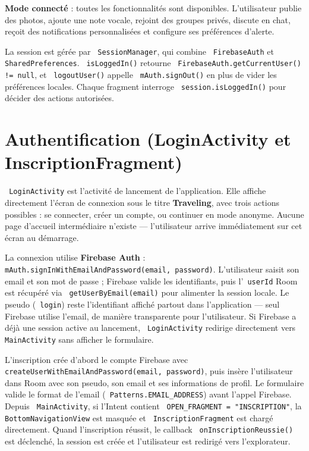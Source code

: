 \documentclass[a4paper,12pt,openany]{report}
\newcommand{\ic}[1]{\texttt{\small\colorbox{lightbg}{\color{navy!90} #1}}}
\begin{document}
\textbf{Mode connecté} : toutes les fonctionnalités sont disponibles.
L'utilisateur publie des photos, ajoute une note vocale, rejoint des groupes
privés, discute en chat, reçoit des notifications personnalisées et configure
ses préférences d'alerte.

La session est gérée par \ic{SessionManager}, qui combine \ic{FirebaseAuth} et
\ic{SharedPreferences}. \ic{isLoggedIn()} retourne \ic{FirebaseAuth.getCurrentUser() != null},
et \ic{logoutUser()} appelle \ic{mAuth.signOut()} en plus de vider les préférences locales.
Chaque fragment interroge \ic{session.isLoggedIn()} pour décider des actions autorisées.

\section{Authentification (LoginActivity et InscriptionFragment)}

\ic{LoginActivity} est l'activité de lancement de l'application. Elle affiche
directement l'écran de connexion sous le titre \textbf{Traveling}, avec trois
actions possibles : se connecter, créer un compte, ou continuer en mode anonyme.
Aucune page d'accueil intermédiaire n'existe — l'utilisateur arrive immédiatement
sur cet écran au démarrage.

La connexion utilise \textbf{Firebase Auth} : \ic{mAuth.signInWithEmailAndPassword(email, password)}.
L'utilisateur saisit son email et son mot de passe ; Firebase valide les identifiants,
puis l'\ic{userId} Room est récupéré via \ic{getUserByEmail(email)} pour alimenter la session locale.
Le pseudo (\ic{login}) reste l'identifiant affiché partout dans l'application — seul Firebase
utilise l'email, de manière transparente pour l'utilisateur.
Si Firebase a déjà une session active au lancement, \ic{LoginActivity} redirige directement
vers \ic{MainActivity} sans afficher le formulaire.

L'inscription crée d'abord le compte Firebase avec \ic{createUserWithEmailAndPassword(email, password)},
puis insère l'utilisateur dans Room avec son pseudo, son email et ses informations de profil.
Le formulaire valide le format de l'email (\ic{Patterns.EMAIL\_ADDRESS}) avant l'appel Firebase.
Depuis \ic{MainActivity}, si l'Intent contient
\ic{OPEN\_FRAGMENT = "INSCRIPTION"}, la \ic{BottomNavigationView} est masquée et
\ic{InscriptionFragment} est chargé directement. Quand l'inscription réussit, le callback
\ic{onInscriptionReussie()} est déclenché, la session est créée et l'utilisateur est
redirigé vers l'explorateur.
\end{document}
